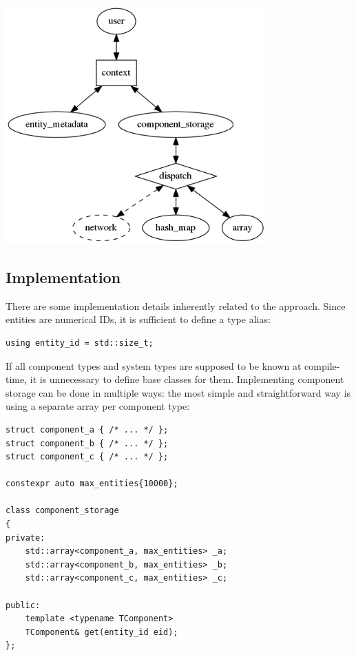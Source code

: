 \documentclass[twoside, 12pt, a4paper, openany]{book}
\let\origfigure=\figure
\let\endorigfigure=\endfigure
\renewenvironment{figure}[1][]{%
\origfigure[H]
}{%
\endorigfigure
}
\begin{document}
\begin{figure}[htbp]
\centering
\includegraphics[width=0.75000\textwidth]{source/figures/generated/ecs/overview/dod_composition/context_role.png}
\caption{DOD: role of the context object}
\end{figure}

\subsection{Implementation}\label{implementation-2}

There are some implementation details inherently related to the
approach. Since entities are numerical IDs, it is sufficient to define a
type alias:

\begin{verbatim}
using entity_id = std::size_t;
\end{verbatim}

If all component types and system types are supposed to be known at
compile-time, it is unnecessary to define base classes for them.
Implementing component storage can be done in multiple ways: the most
simple and straightforward way is using a separate array per component
type:

\begin{verbatim}
struct component_a { /* ... */ };
struct component_b { /* ... */ };
struct component_c { /* ... */ };

constexpr auto max_entities{10000};

class component_storage
{
private:
    std::array<component_a, max_entities> _a;
    std::array<component_b, max_entities> _b;
    std::array<component_c, max_entities> _c;

public:
    template <typename TComponent>
    TComponent& get(entity_id eid);
};
\end{verbatim}
\end{document}
